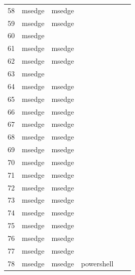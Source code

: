 \documentclass[a4paper,twoside,12pt]{book}
\begin{document}
\begin{appendices}
\begin{table}
\begin{tabular}{l|l|l|l|l|l}
		58  &  msedge &         msedge &                &                &                \\
		59  &  msedge &         msedge &                &                &                \\
		60  &  msedge &                &                &                &                \\
		61  &  msedge &         msedge &                &                &                \\
		62  &  msedge &         msedge &                &                &                \\
		63  &  msedge &                &                &                &                \\
		64  &  msedge &         msedge &                &                &                \\
		65  &  msedge &         msedge &                &                &                \\
		66  &  msedge &         msedge &                &                &                \\
		67  &  msedge &         msedge &                &                &                \\
		68  &  msedge &         msedge &                &                &                \\
		69  &  msedge &         msedge &                &                &                \\
		70  &  msedge &         msedge &                &                &                \\
		71  &  msedge &         msedge &                &                &                \\
		72  &  msedge &         msedge &                &                &                \\
		73  &  msedge &         msedge &                &                &                \\
		74  &  msedge &         msedge &                &                &                \\
		75  &  msedge &         msedge &                &                &                \\
		76  &  msedge &         msedge &                &                &                \\
		77  &  msedge &         msedge &                &                &                \\
		78  &  msedge &         msedge &     powershell &                &                \\

\end{tabular}
\end{table}
\end{appendices}
\end{document}
